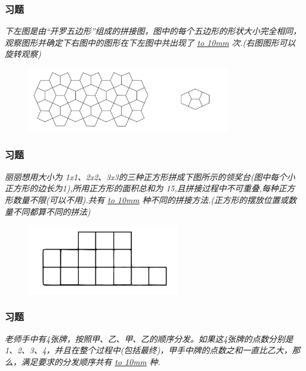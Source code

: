 \begin{frame}
    \frametitle{习题\theframecounter}
    \vspace*{-1cm}
    \textit{下左图是由“开罗五边形”组成的拼接图，图中的每个五边形的形状大小完全相同，观察图形并确定下右图中的图形在下左图中共出现了 \underline{\hbox to 10mm{}} 次.(右图图形可以旋转观察)}
    \begin{figure}[H] 
        \centering
        \includegraphics[width=0.8\textwidth]{./pics/Chapter_6/8.png}
    \end{figure}
\end{frame}

\begin{frame}
    \frametitle{习题\theframecounter}
    \vspace*{-1cm}
    \textit{丽丽想用大小为 1x1、2x2、3x3的三种正方形拼成下图所示的领奖台(图中每个小正方形的边长为1),所用正方形的面积总和为 15,且拼接过程中不可重叠,每种正方形数量不限(可以不用).共有 \underline{\hbox to 10mm{}} 种不同的拼接方法.(正方形的摆放位置或数量不同都算不同的拼法)}
    \begin{figure}[H] 
        \centering
        \includegraphics[width=0.6\textwidth]{./pics/Chapter_6/9.png}
    \end{figure}
\end{frame}

\begin{frame}
    \frametitle{习题\theframecounter}
    \vspace*{-3cm}
    \textit{老师手中有4张牌，按照甲、乙、甲、乙的顺序分发。如果这4张牌的点数分别是 1、2、3、4，并且在整个过程中(包括最终)，甲手中牌的点数之和一直比乙大，那么，满足要求的分发顺序共有 \underline{\hbox to 10mm{}} 种.}
\end{frame}


